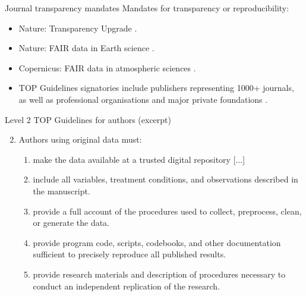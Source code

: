 \documentclass[aspectratio=169, 11pt]{beamer} %
\begin{document}
\begin{frame}{Journal transparency mandates}
  Mandates for transparency or reproducibility:
    \begin{itemize}[label=\textbullet]
        \item Nature: Transparency Upgrade \cite{Nature2017-lq}.
        \item Nature: FAIR data in Earth science \cite{Nature2019-ng}.
        \item Copernicus: FAIR data in atmospheric sciences \cite{Van_Edig2018-bu}.
        \item TOP Guidelines signatories include publishers representing 1000+ journals, as well as professional organisations and major private foundations  \cite{Cos2019-mr}.
    \end{itemize}
\end{frame}


\begin{frame}{Level 2 TOP Guidelines for authors (excerpt)}
  
    \begin{enumerate}[label=\arabic*.]
        \setcounter{enumi}{1}
        
        \item Authors using original data must:
        \begin{enumerate}[label=\alph*.]
            \item make the data available at a trusted digital repository [...]
            \item include all variables, treatment conditions, and observations described in the manuscript.
            \item provide a full account of the procedures used to collect, preprocess, clean, or generate the data.
            \item provide program code, scripts, codebooks, and other documentation sufficient to precisely reproduce all published results.
            \item provide research materials and description of procedures necessary to conduct an independent replication of the research.
        \end{enumerate}
    \end{enumerate}
    \cite{Osf2014-pf}
\end{frame}
\end{document}
